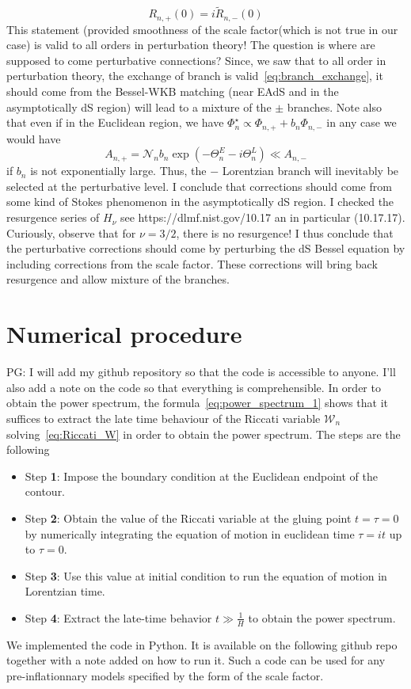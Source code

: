 \documentclass[a4paper,11pt]{article}
\newcommand{\purple}[1]{{\color{purple} #1 \color{black}}}
\newcommand{\PG}[1]{{\purple{PG: #1}}} %
\begin{document}
\begin{equation}\label{eq:branch_exchange}
    R_{n,+}(0) = i \tilde{R}_{n,-}(0)
\end{equation}
This statement (provided smoothness of the scale factor(which is not true in our case) is valid to all orders in perturbation theory! The question is where are supposed to come perturbative connections? Since, we saw that to all order in perturbation theory, the exchange of branch is valid~\eqref{eq:branch_exchange}, it should come from the Bessel-WKB matching (near EAdS and in the asymptotically dS region) will lead to a mixture of the $\pm$ branches. Note also that even if in the Euclidean region, we have $\Phi_n^\star\propto \Phi_{n,+}+b_n \Phi_{n,-}$ in any case we would have 
\begin{equation}
    A_{n,+} = \mathcal{N}_n b_n \exp(-\Theta_n^E-i\Theta_n^L) \ll A_{n,-}
\end{equation}
if $b_n$ is not exponentially large. Thus, the $-$ Lorentzian branch will inevitably be selected at the perturbative level. I conclude that corrections should come from some kind of Stokes phenomenon in the asymptotically dS region. I checked the resurgence series of $H_{\nu}$ see https://dlmf.nist.gov/10.17 an in particular (10.17.17). Curiously, observe that for $\nu = 3/2$, there is no resurgence!  I thus conclude that the perturbative corrections should come by perturbing the dS Bessel equation by including corrections from the scale factor. These corrections will bring back resurgence and allow mixture of the branches.

\section{Numerical procedure}
\PG{I will add my github repository so that the code is accessible to anyone. I'll also add a note on the code so that everything is comprehensible.}
In order to obtain the power spectrum, the formula~\eqref{eq:power_spectrum_1} shows that it suffices to extract the late time behaviour of the Riccati variable $\mathcal{W}_n$ solving~\eqref{eq:Riccati_W} in order to obtain the power spectrum. The steps are the following
\begin{itemize}
    \item Step \textbf{1}: Impose the boundary condition at the Euclidean endpoint of the contour.
    \item Step \textbf{2}: Obtain the value of the Riccati variable at the gluing point $t=\tau=0$ by numerically integrating the equation of motion in euclidean time $\tau = i t$ up to $\tau=0$.
    \item Step \textbf{3}: Use this value at initial condition to run the equation of motion in Lorentzian time.
    \item Step \textbf{4}: Extract the late-time behavior $t \gg \frac{1}{H} $ to obtain the power spectrum.
\end{itemize}
We implemented the code in Python. It is available on the following github repo together with a note added on how to run it. Such a code can be used for any pre-inflationnary models specified by the form of the scale factor.
\end{document}
